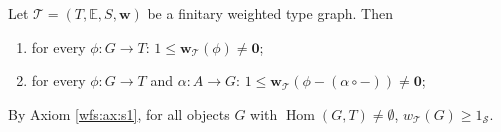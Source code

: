 \begin{lemma}
\label{lem:wf:morphism_weight_geq_1_neq_0}
Let $\mathcal{T} = (T, \mathbb{E}, S, \mathbf{w})$ be a finitary weighted type graph. Then
\begin{enumerate}
    \item for every $\phi : G \to T$: $1 \leq \mathbf{w}_\mathcal{T}(\phi) \neq \mathbf{0}$;
    \item for every $\phi : G \to T$ and $\alpha : A \to G$: $1 \leq \mathbf{w}_\mathcal{T}(\phi - (\alpha \circ -)) \neq \mathbf{0}$;
\end{enumerate}
\end{lemma}
\begin{remark}
    \label{rem:wf:weight_of_object_geq_1}
    By Axiom \eqref{wfs:ax:s1}, for all objects \( G \) with $\operatorname{Hom}(G,T)\neq \emptyset$, \( 
    w_\mathcal{T}(G) \geq 1_\mathcal{S} \).
\end{remark}